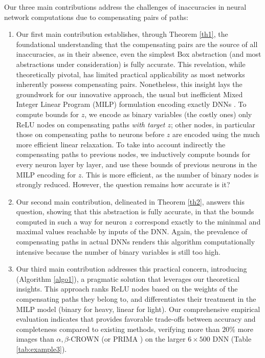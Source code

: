 Our three main contributions address the challenges of inaccuracies in neural network computations due to compensating pairs of paths:
\begin{enumerate}
	\item  Our first main contribution establishes, through Theorem \ref{th1}, the foundational understanding that the compensating pairs are the 	%
	source of {\color{red}all} inaccuracies, 
	{\color{red} as in their absence, even the simplest Box abstraction (and most abstractions under consideration) is fully accurate.}
	This revelation, while theoretically pivotal, has limited practical applicability as most networks inherently possess compensating pairs. Nonetheless, this insight lays the groundwork for our innovative approach, {\color{red}{\em relaxing} the usual but inefficient Mixed Integer Linear Program (MILP) formulation encoding exactly DNNs \cite{MILP}. To compute bounds for $z$, we encode as binary variables (the costly ones) only ReLU nodes on compensating paths {\em with target $z$}; other nodes, in particular those on compensating paths to neurons before $z$ are encoded using the much more efficient linear relaxation. To take into account indirectly the compensating paths to previous nodes, we inductively compute bounds for every neuron layer by layer, and use these bounds of previous neurons in the MILP encoding for $z$. This is more efficient, as the number of binary nodes is strongly reduced. However, the question remains how accurate is it?}
	
\item {\color{red} Our second main contribution, delineated in Theorem \ref{th2}, answers this question, showing that this abstraction is fully accurate, in that the bounds computed in such a way for neuron $z$ correspond exactly to the mininmal and maximal values reachable by inputs of the DNN. Again, the prevalence of compensating paths in actual DNNs renders this algorithm computationally intensive because the number of binary variables is still too high.}

\item Our third main contribution addresses this practical concern, introducing 
\CMP (Algorithm \ref{algo1}), a pragmatic solution that leverages our theoretical insights. This approach ranks ReLU nodes based on {\color{red} 
the weights of the compensating paths they belong to,
and differentiates their treatment in the MILP model (binary for heavy, linear for light). 
Our comprehensive empirical evaluation indicates that \CMP provides favorable trade-offs between accuracy and completeness compared to existing methods, 
verifying more than $20\%$ more images than $\alpha,\beta$-CROWN \cite{xu2020fast} (or PRIMA \cite{prima}) on the larger $6 \times 500$ DNN (Table \ref{tab:example3}).}


\end{enumerate}
